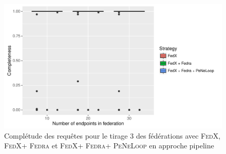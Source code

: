 \documentclass[a4paper]{article}
\def\fedra{\textsc{Fedra}\xspace}
\def\fedx{\textsc{FedX}\xspace}
\def\peneloop{\textsc{PeNeLoop}\xspace}
\begin{document}
\begin{figure}[h]
    \centering
    \includegraphics{boxplots/fed3_completeness.pdf}
    \caption{Complétude des requêtes pour le tirage 3 des fédérations avec \fedx, \fedx + \fedra et \fedx + \fedra + \peneloop en approche pipeline}
    \label{fig:fed3_compl}
\end{figure}
\end{document}
